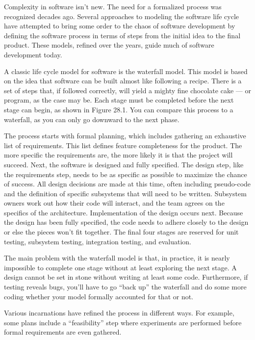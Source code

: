 
Complexity in software isn’t new. The need for a formalized process was recognized decades ago. Several approaches to modeling the software life cycle have attempted to bring some order to the chaos of software development by defining the software process in terms of steps from the initial idea to the final product. These models, refined over the years, guide much of software development today.


A classic life cycle model for software is the waterfall model. This model is based on the idea that software can be built almost like following a recipe. There is a set of steps that, if followed correctly, will yield a mighty fine chocolate cake — or program, as the case may be. Each stage must be completed before the next stage can begin, as shown in Figure 28.1. You can compare this process to a waterfall, as you can only go downward to the next phase.


The process starts with formal planning, which includes gathering an exhaustive list of requirements. This list defines feature completeness for the product. The more specific the requirements are, the more likely it is that the project will succeed. Next, the software is designed and fully specified. The design step, like the requirements step, needs to be as specific as possible to maximize the chance of success. All design decisions are made at this time, often including pseudo-code and the definition of specific subsystems that will need to be written. Subsystem owners work out how their code will interact, and the team agrees on the specifics of the architecture. Implementation of the design occurs next. Because the design has been fully specified, the code needs to adhere closely to the design or else the pieces won’t fit together. The final four stages are reserved for unit testing, subsystem testing, integration testing, and evaluation.

The main problem with the waterfall model is that, in practice, it is nearly impossible to complete one stage without at least exploring the next stage. A design cannot be set in stone without writing at least some code. Furthermore, if testing reveals bugs, you’ll have to go “back up” the waterfall and do some more coding whether your model formally accounted for that or not.

Various incarnations have refined the process in different ways. For example, some plans include a “feasibility” step where experiments are performed before formal requirements are even gathered.

